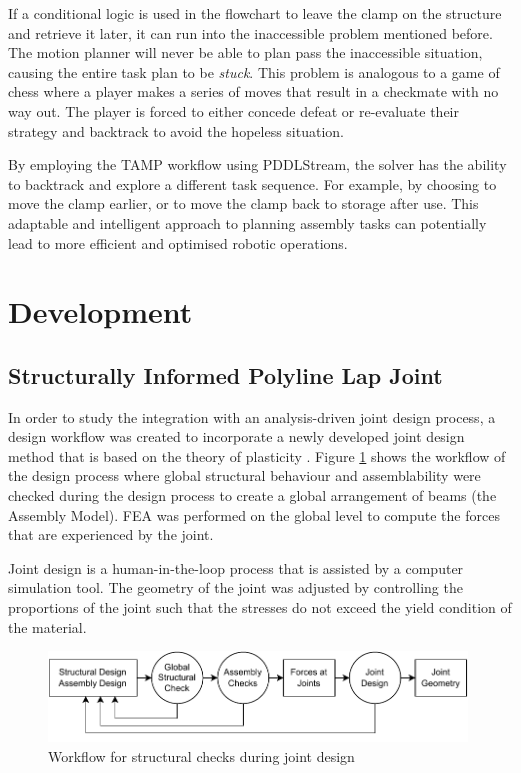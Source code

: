 If a conditional logic is used in the flowchart to leave the clamp on the structure and retrieve it later, it can run into the inaccessible problem mentioned before. The motion planner will never be able to plan pass the inaccessible situation, causing the entire task plan to be \textit{stuck}. This problem is analogous to a game of chess where a player makes a series of moves that result in a checkmate with no way out. The player is forced to either concede defeat or re-evaluate their strategy and backtrack to avoid the hopeless situation.

By employing the TAMP workflow using PDDLStream, the solver has the ability to backtrack and explore a different task sequence. For example, by choosing to move the clamp earlier, or to move the clamp back to storage after use. This adaptable and intelligent approach to planning assembly tasks can potentially lead to more efficient and optimised robotic operations.

\section{Development}
\label{section:exploration-5-development}

\subsection{Structurally Informed Polyline Lap Joint}
\label{subsection:exploration-5-structurally-informed-polyline-lap-joint}

In order to study the integration with an analysis-driven joint design process, a design workflow was created to incorporate a newly developed joint design method that is based on the theory of plasticity \parencite{tanadiniLimitAnalysisTimber2023}. Figure \ref{fig:workflow-for-structural-checks} shows the workflow of the design process where global structural behaviour and assemblability were checked during the design process to create a global arrangement of beams (the Assembly Model). FEA was performed on the global level to compute the forces that are experienced by the joint. 

Joint design is a human-in-the-loop process that is assisted by a computer simulation tool. The geometry of the joint was adjusted by controlling the proportions of the joint such that the stresses do not exceed the yield condition of the material.

\begin{figure}[!h]
    \centering
    \includegraphics[width=0.99\textwidth]{images/08/structural-checks.pdf}
    \caption{Workflow for structural checks during joint design}
    \label{fig:workflow-for-structural-checks}
\end{figure}


